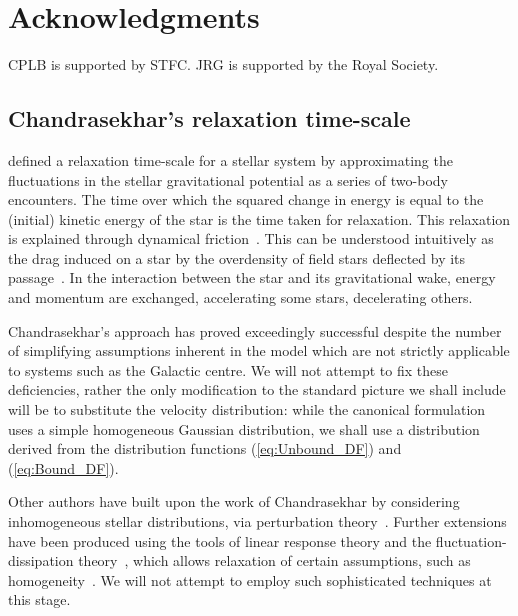 \documentclass[useAMS,usedcolumn,usegraphicx,usenatbib]{mn2e}
\newcommand{\eqnref}[1]{(\ref{eq:#1})}
\begin{document}
\section*{Acknowledgments}
CPLB is supported by STFC. JRG is supported by the Royal Society.




\appendix

\begin{onecolumn}

\section{Chandrasekhar's relaxation time-scale}\label{sec:time-scale}

\citet[chapter 2]{Chandrasekhar1960} defined a relaxation time-scale for a stellar system by approximating the fluctuations in the stellar gravitational potential as a series of two-body encounters. The time over which the squared change in energy is equal to the (initial) kinetic energy of the star is the time taken for relaxation. This relaxation is explained through dynamical friction~\citep{Chandrasekhar1943a, Binney1987}. This can be understood intuitively as the drag induced on a star by the overdensity of field stars deflected by its passage~\citep{Mulder1983}. In the interaction between the star and its gravitational wake, energy and momentum are exchanged, accelerating some stars, decelerating others.

Chandrasekhar's approach has proved exceedingly successful despite the number of simplifying assumptions inherent in the model which are not strictly applicable to systems such as the Galactic centre. We will not attempt to fix these deficiencies, rather the only modification to the standard picture we shall include will be to substitute the velocity distribution: while the canonical formulation uses a simple homogeneous Gaussian distribution, we shall use a distribution derived from the distribution functions \eqnref{Unbound_DF} and \eqnref{Bound_DF}.

Other authors have built upon the work of Chandrasekhar by considering inhomogeneous stellar distributions, via perturbation theory~\citep{Lynden-Bell1972,Tremaine1984,Weinberg1986}. Further extensions have been produced using the tools of linear response theory and the fluctuation-dissipation theory~\citep[chapter 7]{Landau1958}, which allows relaxation of certain assumptions, such as homogeneity~\citep{Bekenstein1992,Maoz1993,Nelson1999}. We will not attempt to employ such sophisticated techniques at this stage.


\end{onecolumn}
\end{document}
